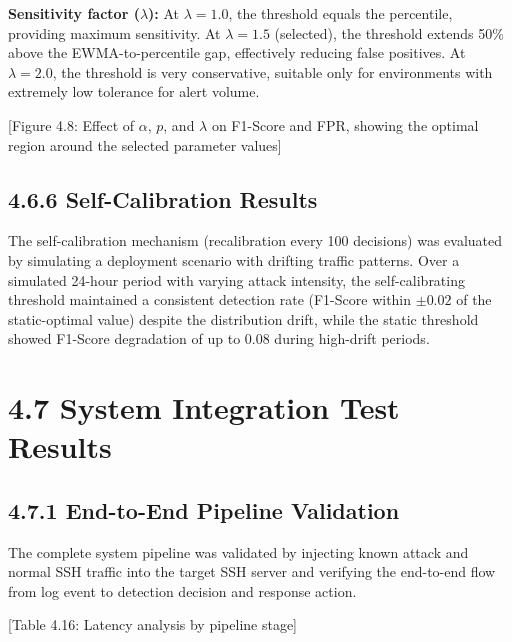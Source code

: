 \documentclass[
  a4paper]{report}
\begin{document}
\textbf{Sensitivity factor (\(\lambda\)):} At \(\lambda = 1.0\), the
threshold equals the percentile, providing maximum sensitivity. At
\(\lambda = 1.5\) (selected), the threshold extends 50\% above the
EWMA-to-percentile gap, effectively reducing false positives. At
\(\lambda = 2.0\), the threshold is very conservative, suitable only for
environments with extremely low tolerance for alert volume.

{[}Figure 4.8: Effect of \(\alpha\), \(p\), and \(\lambda\) on F1-Score
and FPR, showing the optimal region around the selected parameter
values{]}

\subsection{4.6.6 Self-Calibration
Results}\label{self-calibration-results}

The self-calibration mechanism (recalibration every 100 decisions) was
evaluated by simulating a deployment scenario with drifting traffic
patterns. Over a simulated 24-hour period with varying attack intensity,
the self-calibrating threshold maintained a consistent detection rate
(F1-Score within \(\pm 0.02\) of the static-optimal value) despite the
distribution drift, while the static threshold showed F1-Score
degradation of up to 0.08 during high-drift periods.

\section{4.7 System Integration Test
Results}\label{system-integration-test-results}

\subsection{4.7.1 End-to-End Pipeline
Validation}\label{end-to-end-pipeline-validation}

The complete system pipeline was validated by injecting known attack and
normal SSH traffic into the target SSH server and verifying the
end-to-end flow from log event to detection decision and response
action.

{[}Table 4.16: Latency analysis by pipeline stage{]}
\end{document}
